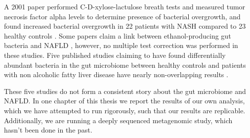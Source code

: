 A 2001 paper performed C-D-xylose-lactulose breath tests and measured tumor necrosis factor alpha levels to determine presence of bacterial overgrowth, and found increased bacterial overgrowth in 22 patients with NASH compared to 23 healthy controls \cite{wigg2001role}. Some papers claim a link between ethanol-producing gut bacteria and NAFLD \cite{zhu2013characterization} \cite{jiang2015dysbiosis}, however, no multiple test correction was performed in these studies. Five published studies claiming to have found differentially abundant bacteria in the gut microbiome between healthy controls and patients with non alcoholic fatty liver disease have nearly non-overlapping results \cite{zhu2013characterization} \cite{wong2013molecular} \cite{raman2013fecal} \cite{jiang2015dysbiosis} \cite{boursier2016severity}.

These five studies do not form a consistent story about the gut microbiome and NAFLD. In one chapter of this thesis we report the results of our own analysis, which we have attempted to run rigorously, such that our results are replicable. Additionally, we are running a deeply sequenced metagenomic study, which hasn’t been done in the past.
